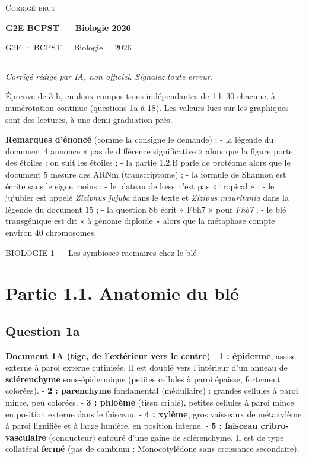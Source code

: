\documentclass[11pt,a4paper]{article}
\begin{document}
\thispagestyle{plain}
\begin{center}
  {\small\scshape Corrigé brut}\par\smallskip
  {\LARGE\bfseries G2E BCPST — Biologie 2026\par}\medskip
  {\large G2E · BCPST · Biologie · 2026\par}
\end{center}
\vspace{2pt}\hrule\vspace{8pt}

\emph{Corrigé rédigé par IA, non officiel. Signalez toute erreur.}

Épreuve de 3 h, en deux compositions indépendantes de 1 h 30 chacune, à numérotation continue (questions 1a à 18). Les valeurs lues sur les graphiques sont des lectures, à une demi-graduation près.

\textbf{Remarques d'énoncé} (comme la consigne le demande) :
- la légende du document 4 annonce « pas de différence significative » alors que la figure porte des étoiles : on suit les étoiles ;
- la partie 1.2.B parle de protéome alors que le document 5 mesure des ARNm (transcriptome) ;
- la formule de Shannon est écrite sans le signe moins ;
- le plateau de lœss n'est pas « tropical » ;
- le jujubier est appelé \emph{Ziziphus jujuba} dans le texte et \emph{Zizipus mauritania} dans la légende du document 15 ;
- la question 8b écrit « Fbh7 » pour \emph{Fhb7} ;
- le blé transgénique est dit « à génome diploïde » alors que la métaphase compte environ 40 chromosomes.

BIOLOGIE 1 --- Les symbioses racinaires chez le blé

\hypertarget{partie-1.1.-anatomie-du-bluxe9}{%
\section{Partie 1.1. Anatomie du blé}\label{partie-1.1.-anatomie-du-bluxe9}}

\hypertarget{question-1a}{%
\subsection{Question 1a}\label{question-1a}}

\textbf{Document 1A (tige, de l'extérieur vers le centre)}
- \textbf{1 : épiderme}, assise externe à paroi externe cutinisée. Il est doublé vers l'intérieur d'un anneau de \textbf{sclérenchyme} sous-épidermique (petites cellules à paroi épaisse, fortement colorées).
- \textbf{2 : parenchyme} fondamental (médullaire) : grandes cellules à paroi mince, peu colorées.
- \textbf{3 : phloème} (tissu criblé), petites cellules à paroi mince en position externe dans le faisceau.
- \textbf{4 : xylème}, gros vaisseaux de métaxylème à paroi lignifiée et à large lumière, en position interne.
- \textbf{5 : faisceau cribro-vasculaire} (conducteur) entouré d'une gaine de sclérenchyme. Il est de type collatéral \textbf{fermé} (pas de cambium : Monocotylédone sans croissance secondaire).
\end{document}
